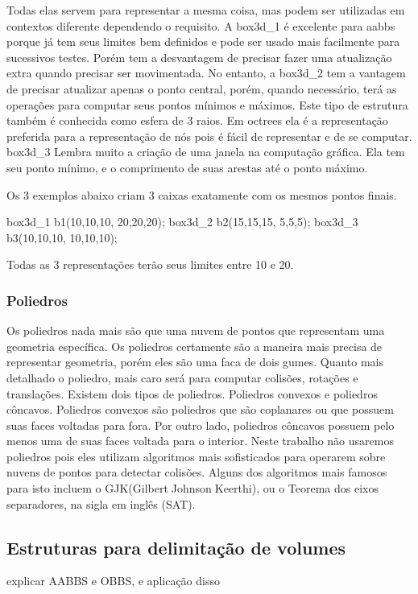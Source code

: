 Todas elas servem para representar a mesma coisa, mas podem ser utilizadas em
contextos diferente dependendo o requisito. A box3d_1 é excelente para aabbs
porque já tem seus limites bem definidos e pode ser usado mais facilmente para
sucessivos testes. Porém tem a desvantagem de precisar fazer uma atualização
extra quando precisar ser movimentada.
No entanto, a box3d_2 tem a vantagem de precisar atualizar apenas o ponto
central, porém, quando necessário, terá as operações para computar seus pontos
mínimos e máximos. Este tipo de estrutura também é conhecida como esfera de 3
raios. Em octrees ela é a representação preferida para a representação de nós
pois é fácil de representar e de se computar.
box3d_3 Lembra muito a criação de uma janela na computação gráfica. Ela tem seu
ponto mínimo, e o comprimento de suas arestas até o ponto máximo.

Os 3 exemplos abaixo criam 3 caixas exatamente com os mesmos pontos finais.

box3d_1 b1({10,10,10}, {20,20,20});
box3d_2 b2({15,15,15}, {5,5,5});
box3d_3 b3({10,10,10}, {10,10,10});

Todas as 3 representações terão seus limites entre 10 e 20.


\subsubsection{Poliedros}

Os poliedros nada mais são que uma nuvem de pontos que representam uma
geometria específica. Os poliedros certamente são a maneira mais precisa de
representar geometria, porém eles são uma faca de dois gumes. Quanto mais
detalhado o poliedro, mais caro será para computar colisões, rotações e
translações. Existem dois tipos de poliedros. Poliedros convexos e poliedros
côncavos. Poliedros convexos são poliedros que são coplanares ou que possuem
suas faces voltadas para fora. Por outro lado, poliedros côncavos possuem
pelo menos uma de suas faces voltada para o interior.
Neste trabalho não usaremos poliedros pois eles utilizam algoritmos mais
sofisticados para operarem sobre nuvens de pontos para detectar colisões.
Alguns dos algoritmos mais famosos para isto incluem o
GJK(GilbertJohnsonKeerthi), ou o Teorema dos eixos separadores, na sigla em
inglês (SAT).

\subsection{ Estruturas para delimitação de volumes}
explicar AABBS e OBBS, e aplicação disso

